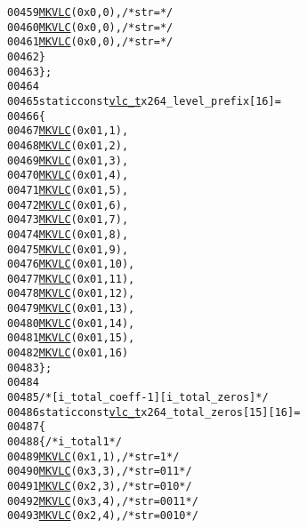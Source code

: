 \begin{footnotesize}
\begin{alltt}
00459         \hyperlink{vlc_8h_aa680b26539d09b5954221ff39a127faa}{MKVLC}( 0x0, 0 ), \textcolor{comment}{/* str= */}
00460         \hyperlink{vlc_8h_aa680b26539d09b5954221ff39a127faa}{MKVLC}( 0x0, 0 ), \textcolor{comment}{/* str= */}
00461         \hyperlink{vlc_8h_aa680b26539d09b5954221ff39a127faa}{MKVLC}( 0x0, 0 ), \textcolor{comment}{/* str= */}
00462     \}
00463 \};
00464 
00465 \textcolor{keyword}{static} \textcolor{keyword}{const} \hyperlink{structvlc__t}{vlc_t} x264\_level\_prefix[16] =
00466 \{
00467     \hyperlink{vlc_8h_aa680b26539d09b5954221ff39a127faa}{MKVLC}( 0x01,  1 ),
00468     \hyperlink{vlc_8h_aa680b26539d09b5954221ff39a127faa}{MKVLC}( 0x01,  2 ),
00469     \hyperlink{vlc_8h_aa680b26539d09b5954221ff39a127faa}{MKVLC}( 0x01,  3 ),
00470     \hyperlink{vlc_8h_aa680b26539d09b5954221ff39a127faa}{MKVLC}( 0x01,  4 ),
00471     \hyperlink{vlc_8h_aa680b26539d09b5954221ff39a127faa}{MKVLC}( 0x01,  5 ),
00472     \hyperlink{vlc_8h_aa680b26539d09b5954221ff39a127faa}{MKVLC}( 0x01,  6 ),
00473     \hyperlink{vlc_8h_aa680b26539d09b5954221ff39a127faa}{MKVLC}( 0x01,  7 ),
00474     \hyperlink{vlc_8h_aa680b26539d09b5954221ff39a127faa}{MKVLC}( 0x01,  8 ),
00475     \hyperlink{vlc_8h_aa680b26539d09b5954221ff39a127faa}{MKVLC}( 0x01,  9 ),
00476     \hyperlink{vlc_8h_aa680b26539d09b5954221ff39a127faa}{MKVLC}( 0x01, 10 ),
00477     \hyperlink{vlc_8h_aa680b26539d09b5954221ff39a127faa}{MKVLC}( 0x01, 11 ),
00478     \hyperlink{vlc_8h_aa680b26539d09b5954221ff39a127faa}{MKVLC}( 0x01, 12 ),
00479     \hyperlink{vlc_8h_aa680b26539d09b5954221ff39a127faa}{MKVLC}( 0x01, 13 ),
00480     \hyperlink{vlc_8h_aa680b26539d09b5954221ff39a127faa}{MKVLC}( 0x01, 14 ),
00481     \hyperlink{vlc_8h_aa680b26539d09b5954221ff39a127faa}{MKVLC}( 0x01, 15 ),
00482     \hyperlink{vlc_8h_aa680b26539d09b5954221ff39a127faa}{MKVLC}( 0x01, 16 )
00483 \};
00484 
00485 \textcolor{comment}{/* [i\_total\_coeff-1][i\_total\_zeros] */}
00486 \textcolor{keyword}{static} \textcolor{keyword}{const} \hyperlink{structvlc__t}{vlc_t} x264\_total\_zeros[15][16] =
00487 \{
00488     \{ \textcolor{comment}{/* i\_total 1 */}
00489         \hyperlink{vlc_8h_aa680b26539d09b5954221ff39a127faa}{MKVLC}( 0x1, 1 ), \textcolor{comment}{/* str=1 */}
00490         \hyperlink{vlc_8h_aa680b26539d09b5954221ff39a127faa}{MKVLC}( 0x3, 3 ), \textcolor{comment}{/* str=011 */}
00491         \hyperlink{vlc_8h_aa680b26539d09b5954221ff39a127faa}{MKVLC}( 0x2, 3 ), \textcolor{comment}{/* str=010 */}
00492         \hyperlink{vlc_8h_aa680b26539d09b5954221ff39a127faa}{MKVLC}( 0x3, 4 ), \textcolor{comment}{/* str=0011 */}
00493         \hyperlink{vlc_8h_aa680b26539d09b5954221ff39a127faa}{MKVLC}( 0x2, 4 ), \textcolor{comment}{/* str=0010 */}

\end{alltt}
\end{footnotesize}
